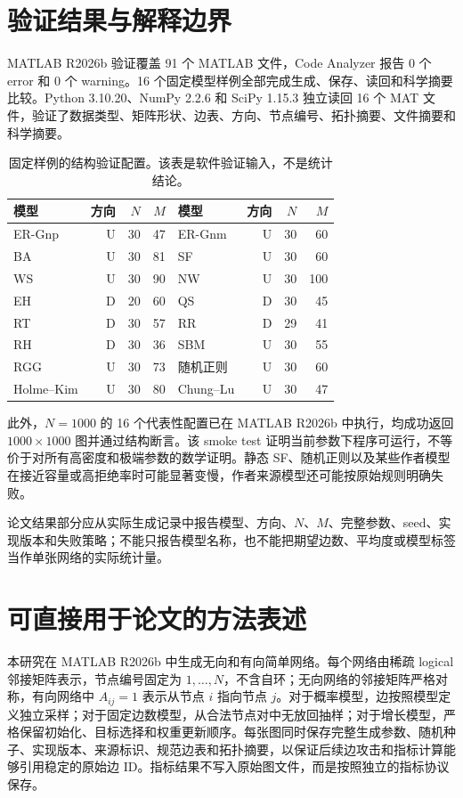 \documentclass[UTF8,a4paper,11pt]{ctexart}
\begin{document}
\section{验证结果与解释边界}
MATLAB R2026b 验证覆盖 91 个 MATLAB 文件，Code Analyzer 报告 0 个 error 和 0 个 warning。16 个固定模型样例全部完成生成、保存、读回和科学摘要比较。Python 3.10.20、NumPy 2.2.6 和 SciPy 1.15.3 独立读回 16 个 MAT 文件，验证了数据类型、矩阵形状、边表、方向、节点编号、拓扑摘要、文件摘要和科学摘要。

\begin{table}[htbp]
\centering
\caption{固定样例的结构验证配置。该表是软件验证输入，不是统计结论。}
\small
\begin{tabular}{lrrr|lrrr}
\toprule
模型 & 方向 & $N$ & $M$ & 模型 & 方向 & $N$ & $M$ \\
\midrule
ER-Gnp & U & 30 & 47 & ER-Gnm & U & 30 & 60 \\
BA & U & 30 & 81 & SF & U & 30 & 60 \\
WS & U & 30 & 90 & NW & U & 30 & 100 \\
EH & D & 20 & 60 & QS & D & 30 & 45 \\
RT & D & 30 & 57 & RR & D & 29 & 41 \\
RH & D & 30 & 36 & SBM & U & 30 & 55 \\
RGG & U & 30 & 73 & 随机正则 & U & 30 & 60 \\
Holme--Kim & U & 30 & 80 & Chung--Lu & U & 30 & 47 \\
\bottomrule
\end{tabular}
\end{table}

此外，$N=1000$ 的 16 个代表性配置已在 MATLAB R2026b 中执行，均成功返回 $1000\times1000$ 图并通过结构断言。该 smoke test 证明当前参数下程序可运行，不等价于对所有高密度和极端参数的数学证明。静态 SF、随机正则以及某些作者模型在接近容量或高拒绝率时可能显著变慢，作者来源模型还可能按原始规则明确失败。

论文结果部分应从实际生成记录中报告模型、方向、$N$、$M$、完整参数、seed、实现版本和失败策略；不能只报告模型名称，也不能把期望边数、平均度或模型标签当作单张网络的实际统计量。

\section{可直接用于论文的方法表述}
本研究在 MATLAB R2026b 中生成无向和有向简单网络。每个网络由稀疏 logical 邻接矩阵表示，节点编号固定为 $1,\ldots,N$，不含自环；无向网络的邻接矩阵严格对称，有向网络中 $A_{ij}=1$ 表示从节点 $i$ 指向节点 $j$。对于概率模型，边按照模型定义独立采样；对于固定边数模型，从合法节点对中无放回抽样；对于增长模型，严格保留初始化、目标选择和权重更新顺序。每张图同时保存完整生成参数、随机种子、实现版本、来源标识、规范边表和拓扑摘要，以保证后续边攻击和指标计算能够引用稳定的原始边 ID。指标结果不写入原始图文件，而是按照独立的指标协议保存。
\end{document}
